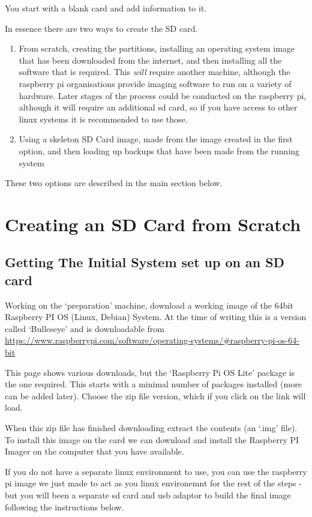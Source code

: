 \documentclass[Draft]{akc}
\begin{document}
You start with a blank card and add information to it.

In essence there are two ways to create the SD card.

\begin{enumerate}
\item From scratch, creating the partitions, installing an operating system image that has been
downloaded from the internet, and then installing all the software that is required.  This
\emph{will} require another machine, although the raspberry pi organisations provide imaging software to run on a variety of hardware.
Later stages of the process could be conducted on the raspberry pi, although it will require an additional sd card, so if you have access
to other linux systems it is recommended to use those.
\item Using a skeleton SD Card image, made from the image created in the first option, and then loading up backups that have been made
from the running system
\end{enumerate}

These two options are described in the main section below.

\section{Creating an SD Card from Scratch}
\subsection{Getting The Initial System set up on an SD card}
Working on the `preparation' machine, download a working image of the 64bit Raspberry PI OS (Linux, Debian) System.  At the time of writing
this is a version called `Bulleseye' and is downloadable from
\url{https://www.raspberrypi.com/software/operating-systems/#raspberry-pi-os-64-bit}

This page shows various downloads, but the `Raspberry Pi OS Lite' package is the one required. This starts
with a minimal number of packages installed (more can be added later). Choose the zip file version,
which if you click on the link will load.

When this zip file has finished downloading extract the contents (an `.img' file).
To install this image on the card we can download and install the Raspberry PI Imager on the computer that you have available.

If you do not have a separate linux environment to use, you can use the raspberry pi image we just made to act as you linux environemnt
for the rest of the steps - but you will been a separate sd card and usb adaptor to build the final image following the instructions below.
\end{document}
